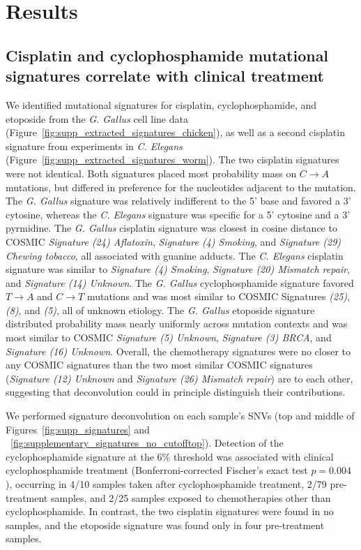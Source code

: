 \section*{Results}

\subsection*{Cisplatin and cyclophosphamide mutational signatures correlate with clinical treatment}

We identified mutational signatures for cisplatin, cyclophosphamide, and etoposide from the \textit{G. Gallus} cell line data (Figure~\ref{fig:supp_extracted_signatures_chicken}), as well as a second cisplatin signature from experiments in \textit{C. Elegans} (Figure~\ref{fig:supp_extracted_signatures_worm}). The two cisplatin signatures were not identical. Both signatures placed most probability mass on $C \rightarrow A$ mutations, but differed in preference for the nucleotides adjacent to the mutation. The \textit{G. Gallus} signature was relatively indifferent to the 5' base and favored a 3' cytosine, whereas the \textit{C. Elegans} signature was specific for a 5' cytosine and a 3' pyrmidine. The \textit{G. Gallus} cisplatin signature was closest in cosine distance to COSMIC \textit{Signature (24) Aflatoxin}, \textit{Signature (4) Smoking}, and \textit{Signature (29) Chewing tobacco}, all associated with guanine adducts. The \textit{C. Elegans} cisplatin signature was similar to \textit{Signature (4) Smoking}, \textit{Signature (20) Mismatch repair}, and \textit{Signature (14) Unknown}. The \textit{G. Gallus} cyclophosphamide signature favored $T \rightarrow A$ and $C \rightarrow T$ mutations and was most similar to COSMIC Signatures \textit{(25)}, \textit{(8)}, and \textit{(5)}, all of unknown etiology. The \textit{G. Gallus} etoposide signature distributed probability mass nearly uniformly across mutation contexts and was most similar to COSMIC \textit{Signature (5) Unknown}, \textit{Signature (3) BRCA}, and \textit{Signature (16) Unknown}. Overall, the chemotherapy signatures were no closer to any COSMIC signatures than the two most similar COSMIC signatures (\textit{Signature (12) Unknown} and \textit{Signature (26) Mismatch repair}) are to each other, suggesting that deconvolution could in principle distinguish their contributions.

We performed signature deconvolution on each sample's SNVs (top and middle of Figures~\ref{fig:supp_signatures} and ~\ref{fig:supplementary_signatures_no_cutofftop}). Detection of the cyclophosphamide signature at the 6\% threshold was associated with clinical cyclophosphamide treatment (Bonferroni-corrected Fischer's exact test $p = 0.004$), occurring in 4/10 samples taken after cyclophosphamide treatment, 2/79 pre-treatment samples, and 2/25 samples exposed to chemotherapies other than cyclophosphamide. In contrast, the two cisplatin signatures were found in no samples, and the etoposide signature was found only in four pre-treatment samples.

